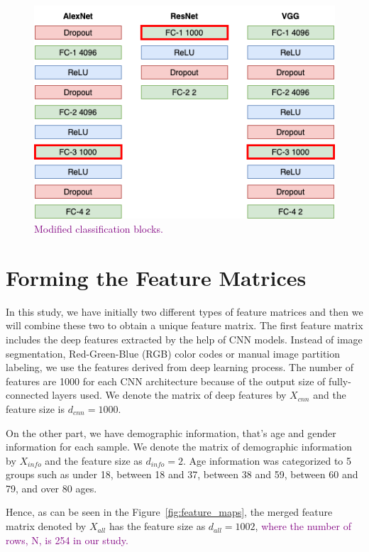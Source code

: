\begin{figure}[h]
    \centering
    \includegraphics[width=.8\linewidth]{fig/modified_classification_blocks.png}
    \vspace{2mm}
    \caption{\textcolor{purple}{Modified classification blocks.}}
    \label{fig:modified_classification_blocks}
\end{figure}

\section{Forming the Feature Matrices} \label{sec:CH5_forming_features}

In this study, we have initially two different types of feature matrices and then we will combine these two to obtain a unique feature matrix. The first feature matrix includes the deep features extracted by the help of CNN models. Instead of image segmentation, Red-Green-Blue (RGB) color codes or manual image partition labeling, we use the features derived from deep learning process. The number of features are 1000 for each CNN architecture because of the output size of fully-connected layers used. We denote the matrix of deep features by $X_{cnn}$ and the feature size is $d_{cnn} = 1000$.

On the other part, we have demographic information, that's age and gender information for each sample. We denote the matrix of demographic information by $X_{info}$ and the feature size as $d_{info} = 2$. Age information was categorized to 5 groups such as under 18, between 18 and 37, between 38 and 59, between 60 and 79, and over 80 ages.

Hence, as can be seen in the Figure~\ref{fig:feature_maps}, the merged feature matrix denoted by $X_{all}$ has the feature size as $d_{all} = 1002$, \textcolor{purple}{where the number of rows, N, is 254 in our study.}


